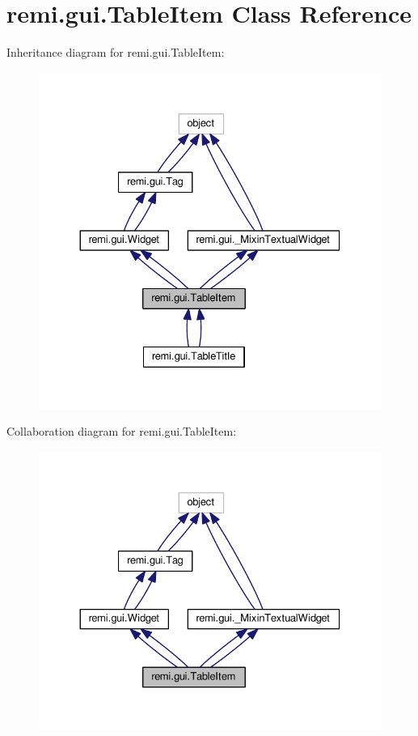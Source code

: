 \hypertarget{classremi_1_1gui_1_1TableItem}{}\section{remi.\+gui.\+Table\+Item Class Reference}
\label{classremi_1_1gui_1_1TableItem}


Inheritance diagram for remi.\+gui.\+Table\+Item\+:
\nopagebreak
\begin{figure}[H]
\begin{center}
\leavevmode
\includegraphics[width=330pt]{d4/d99/classremi_1_1gui_1_1TableItem__inherit__graph}
\end{center}
\end{figure}


Collaboration diagram for remi.\+gui.\+Table\+Item\+:
\nopagebreak
\begin{figure}[H]
\begin{center}
\leavevmode
\includegraphics[width=330pt]{d5/dfd/classremi_1_1gui_1_1TableItem__coll__graph}
\end{center}
\end{figure}
